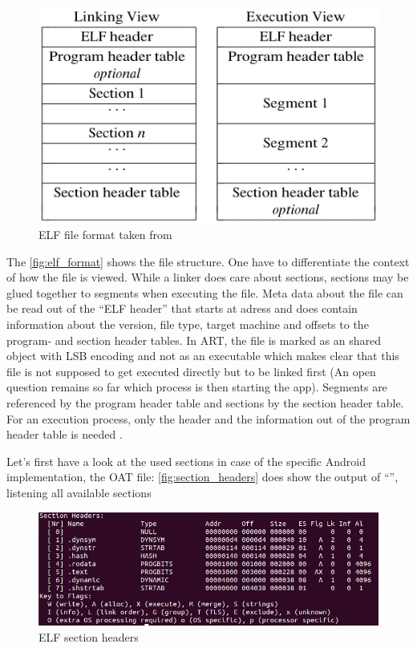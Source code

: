 \begin{figure}[htb]
  \centering
  \includegraphics[scale=0.4]{figures/elf_format}
  \caption[ELF file format]{ELF file format taken from \parencite{portable_formats_spec}}
  \label{fig:elf_format}
\end{figure}

The \autoref{fig:elf_format} shows the file structure.
One have to differentiate the context of how the file is viewed.
While a linker does care about sections, sections may be
glued together to segments when executing the file.
Meta data about the file can be read out of the ``ELF header''
that starts at adress  and does contain
information about the version, file type, target machine and
offsets to the program- and section header tables.
In ART, the file is marked as an shared object with LSB encoding
and not as an executable which makes clear that this file is not
supposed to get executed directly but to be linked first
(An open question remains so far which process is then starting
the app).
Segments are referenced by the program header table and sections
by the section header table. For an execution process, only the header
and the information out of the program header table is needed
\parencite{life_of_binaries}.

Let's first have a look at the used sections in case of the specific
Android implementation, the OAT file:
\autoref{fig:section_headers} does show the output of
``'', listening all available sections

\begin{figure}[htb]
  \centering
  \includegraphics[width=\textwidth]{figures/android_elf_section_headers}
  \caption[ELF section headers]{ELF section headers}
  \label{fig:section_headers}
\end{figure}

